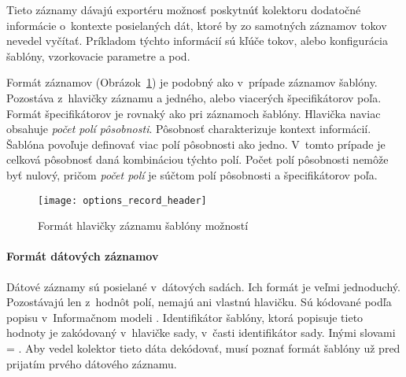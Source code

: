 Tieto záznamy dávajú exportéru možnosť poskytnúť kolektoru dodatočné informácie o~kontexte posielaných dát, 
ktoré by zo samotných 
záznamov tokov nevedel vyčítať. Príkladom týchto informácií sú kľúče tokov, alebo konfigurácia šablóny,
vzorkovacie parametre a pod.

Formát záznamov (Obrázok~\ref{o:options_record_header}) je podobný ako v~prípade záznamov šablóny. Pozostáva z~hlavičky záznamu 
a jedného, alebo viacerých špecifikátorov poľa. Formát špecifikátorov je rovnaký ako pri záznamoch šablóny.
Hlavička naviac obsahuje \emph{počet polí pôsobnosti}. Pôsobnosť charakterizuje kontext 
informácií. Šablóna povoľuje 
definovať viac polí pôsobnosti ako jedno. V~tomto prípade je celková pôsobnosť daná kombináciou týchto polí.
Počet polí pôsobnosti nemôže byť nulový, pričom \emph{počet polí} je 
súčtom polí pôsobnosti a špecifikátorov poľa.\citep{rfc5102}

\begin{figure}[ht!]
\centering
\texttt{[image: options\_record\_header]}
\caption{Formát hlavičky záznamu šablóny možností}\label{o:options_record_header}
\end{figure}



\paragraph{Formát dátových záznamov}

Dátové záznamy sú posielané v~dátových sadách. Ich formát je veľmi 
jednoduchý. Pozostávajú len z~hodnôt polí, nemajú ani vlastnú hlavičku. 
Sú kódované podľa popisu v~Informačnom modeli \citep{rfc5102}. Identifikátor 
šablóny, ktorá popisuje tieto hodnoty je zakódovaný v~hlavičke sady, v~časti
identifikátor sady. Inými slovami  = . Aby vedel kolektor tieto dáta dekódovať, musí poznať formát šablóny 
už pred prijatím prvého dátového záznamu.


